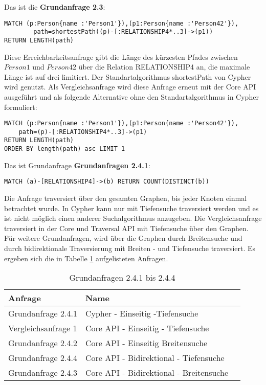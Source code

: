 \noindent Das ist die \textbf{Grundanfrage 2.3}: 
\begin{Verbatim}[frame=single]
MATCH (p:Person{name :'Person1'}),(p1:Person{name :'Person42'}),
		path=shortestPath((p)-[:RELATIONSHIP4*..3]->(p1)) 
RETURN LENGTH(path)
\end{Verbatim} 
Diese Erreichbarkeitsanfrage gibt die Länge des kürzesten Pfades zwischen $Person1$ und $Person42$ über die Relation RELATIONSHIP4 an, die maximale Länge ist auf drei limitiert. Der Standartalgorithmus shortestPath von Cypher wird genutzt. Als Vergleichsanfrage wird diese Anfrage erneut mit der Core API ausgeführt und als folgende Alternative ohne den Standartalgorithmus in Cypher formuliert: 
\begin{Verbatim}[frame=single]
MATCH (p:Person{name :'Person1'}),(p1:Person{name :'Person42'}),
	path=(p)-[:RELATIONSHIP4*..3]->(p1) 
RETURN LENGTH(path)
ORDER BY length(path) asc LIMIT 1
\end{Verbatim}
 Das ist Grundanfrage \textbf{Grundanfragen 2.4.1}:
 \begin{Verbatim}[frame=single]
 MATCH (a)-[RELATIONSHIP4]->(b) RETURN COUNT(DISTINCT(b))
 \end{Verbatim}
Die Anfrage traversiert über den gesamten Graphen, bis jeder Knoten einmal betrachtet wurde. In Cypher kann nur mit Tiefensuche traversiert werden und es ist nicht möglich einen anderer Suchalgorithmus anzugeben. Die Vergleichsanfrage traversiert in der Core und Traversal API mit Tiefensuche über den Graphen. Für weitere Grundanfragen, wird über die Graphen durch  Breitensuche und durch bidirektionale Traversierung mit Breiten - und Tiefensuche traversiert. Es ergeben sich die in Tabelle \ref{tab:Intro_Query2_4} aufgelisteten Anfragen. 
\FloatBarrier
\begin{table}[h]
	\centering
	\begin{tabular}{ |p{5cm}||p{7cm}|p{3cm}  }
		\hline
		Anfrage& Name\\
		\hline
		Grundanfrage 2.4.1 &  Cypher - Einseitig -Tiefensuche\\
		Vergleichsanfrage 1 &  Core API - Einseitig - Tiefensuche \\
		Grundanfrage 2.4.2 &  Core API - Einseitig Breitensuche\\
		Grundanfrage 2.4.4 &  Core API -  Bidirektional - Tiefensuche\\
		Grundanfrage 2.4.3&  Core API - Bidirektional - Breitensuche\\
		\hline
	\end{tabular}
	\caption{Grundanfragen 2.4.1 bis 2.4.4}
	\label{tab:Intro_Query2_4}
\end{table}
\FloatBarrier
